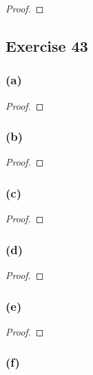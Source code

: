 \documentclass[14pt]{extarticle}
\begin{document}
\begin{proof}

\end{proof}

\subsection{Exercise 43}

\subsubsection{(a)}

\begin{proof}

\end{proof}

\subsubsection{(b)}

\begin{proof}

\end{proof}

\subsubsection{(c)}

\begin{proof}

\end{proof}

\subsubsection{(d)}

\begin{proof}

\end{proof}

\subsubsection{(e)}

\begin{proof}

\end{proof}

\subsubsection{(f)}
\end{document}
